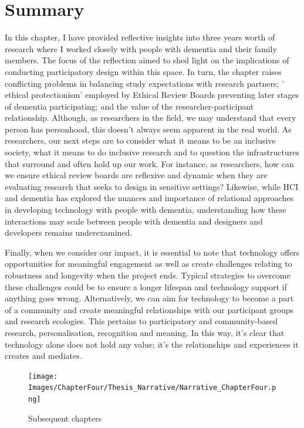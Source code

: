 \section{Summary}
\label{Relationships:Summary}
In this chapter, I have provided reflective insights into three years worth of research where I worked closely with people with dementia and their family members. The focus of the reflection aimed to shed light on the implications of conducting participatory design within this space. In turn, the chapter raises conflicting problems in balancing study expectations with research partners; ' ethical protectionism' employed by Ethical Review Boards preventing later stages of dementia participating; and the value of the researcher-participant relationship. Although, as researchers in the field, we may understand that every person has personhood, this doesn't always seem apparent in the real world. As researchers, our next steps are to consider what it means to be an inclusive society, what it means to do inclusive research and to question the infrastructures that surround and often hold up our work. For instance, as researchers, how can we ensure ethical review boards are reflexive and dynamic when they are evaluating research that seeks to design in sensitive settings? Likewise, while HCI and dementia has explored the nuances and importance of relational approaches in developing technology with people with dementia, understanding how these interactions may scale between people with dementia and designers and developers remains underexamined.

Finally, when we consider our impact, it is essential to note that technology offers opportunities for meaningful engagement as well as create challenges relating to robustness and longevity when the project ends. Typical strategies to overcome these challenges could be to ensure a longer lifespan and technology support if anything goes wrong. Alternatively, we can aim for technology to become a part of a community and create meaningful relationships with our participant groups and research ecologies. This pertains to participatory and community-based research, personalisation, recognition and meaning. In this way, it's clear that technology alone does not hold any value; it's the relationships and experiences it creates and mediates.

\begin{figure}[htp]
\centering
\texttt{[image: Images/ChapterFour/Thesis\_Narrative/Narrative\_ChapterFour.png]}
\caption{Subsequent chapters}
\label{fig:ChapterFour_FutureStudies}
\end{figure}

